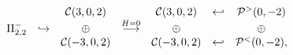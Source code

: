 \begin{equation}
\left.
\begin{array}{ccccccc}
&& {\cal C}(3,0,2)& &{\cal C}(3,0,2)&\hookleftarrow &{\cal P}^{>}(0,-2)\\
\Pi^-_{2,2} &\hookrightarrow &\oplus&\stackrel{H=0}{\longrightarrow}&\oplus &&\oplus\\
&& {\cal C}(-3,0,2)&& {\cal C}(-3,0,2)&\hookleftarrow &{\cal P}^{<}(0,-2),\\
\end{array}
\right.
\end{equation}

